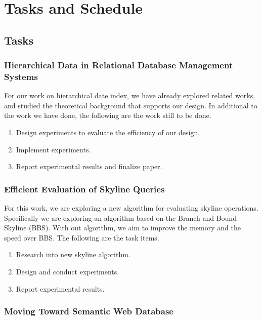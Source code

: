 \chapter{Tasks and Schedule}

\section{Tasks}

\subsection{Hierarchical Data in Relational Database Management Systems}

For our work on hierarchical date index, we have already explored related works, and studied the theoretical background that supports our design. In additional to the work we have done, the following are the work still to be done.

\begin{enumerate}
\item Design experiments to evaluate the efficiency of our design.
\item Implement experiments.
\item Report experimental results and finalize paper.
\end{enumerate}


\subsection{Efficient Evaluation of Skyline Queries}

For this work, we are exploring a new algorithm for evaluating skyline operations. Specifically we are exploring an algorithm based on the Branch and Bound Skyline (BBS). With out algorithm, we aim to improve the memory and the speed over BBS. The following are the task items.

\begin{enumerate}
\item Research into new skyline algorithm.
\item Design and conduct experiments.
\item Report experimental results.
\end{enumerate}

\subsection{Moving Toward Semantic Web Database}

